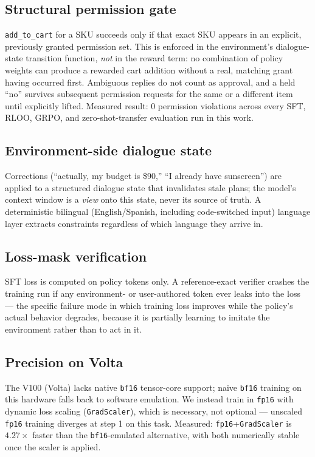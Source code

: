 \documentclass[11pt]{article}
\begin{document}
\subsection{Structural permission gate}
\texttt{add\_to\_cart} for a SKU succeeds only if that exact SKU appears in an
explicit, previously granted permission set. This is enforced in the
environment's dialogue-state transition function, \emph{not} in the reward term:
no combination of policy weights can produce a rewarded cart addition without a
real, matching grant having occurred first. Ambiguous replies do not count as
approval, and a held ``no'' survives subsequent permission requests for the same
or a different item until explicitly lifted. Measured result: 0 permission
violations across every SFT, RLOO, GRPO, and zero-shot-transfer evaluation run in
this work.

\subsection{Environment-side dialogue state}
Corrections (``actually, my budget is \$90,'' ``I already have sunscreen'') are
applied to a structured dialogue state that invalidates stale plans; the model's
context window is a \emph{view} onto this state, never its source of truth. A
deterministic bilingual (English/Spanish, including code-switched input) language
layer extracts constraints regardless of which language they arrive in.

\subsection{Loss-mask verification}
SFT loss is computed on policy tokens only. A reference-exact verifier crashes the
training run if any environment- or user-authored token ever leaks into the loss
--- the specific failure mode in which training loss improves while the policy's
actual behavior degrades, because it is partially learning to imitate the
environment rather than to act in it.

\subsection{Precision on Volta}
The V100 (Volta) lacks native \texttt{bf16} tensor-core support; naive
\texttt{bf16} training on this hardware falls back to software emulation. We
instead train in \texttt{fp16} with dynamic loss scaling (\texttt{GradScaler}),
which is necessary, not optional --- unscaled \texttt{fp16} training diverges at
step 1 on this task. Measured: \texttt{fp16}+\texttt{GradScaler} is
$4.27\times$ faster than the \texttt{bf16}-emulated alternative, with both
numerically stable once the scaler is applied.
\end{document}
